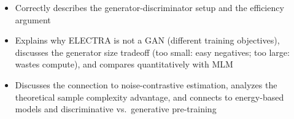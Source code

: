 \begin{interviewq}
\goodgreat
\begin{itemize}
    \item {} Correctly describes the generator-discriminator setup and
          the efficiency argument
    \item {} Explains why ELECTRA is not a GAN (different training
          objectives), discusses the generator size tradeoff (too small: easy negatives;
          too large: wastes compute), and compares quantitatively with MLM
    \item {} Discusses the connection to noise-contrastive estimation,
          analyzes the theoretical sample complexity advantage, and connects to
          energy-based models and discriminative vs.\ generative pre-training
\end{itemize}

\end{interviewq}

\bigskip

